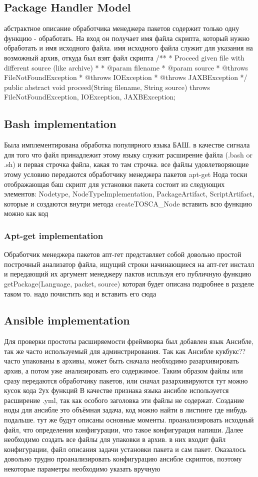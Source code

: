 \subsection*{Package Handler Model}
абстрактное описание обработчика менеджера пакетов содержит только одну функцию - обработать. 
На вход он получает имя файла скрипта, который нужно обработать и имя исходного файла. имя исходного файла служит для указания на возможный архив, откуда был взят файл скрипта
	/**
* Proceed given file with different source (like archive)
* 
* @param filename
* @param source
* @throws FileNotFoundException
* @throws IOException
* @throws JAXBException
*/
public abstract void proceed(String filename, String source) throws FileNotFoundException, IOException, JAXBException;
\fi
\subsection*{Bash implementation}
Была имплементирована обработка популярного языка БАШ. 
в качестве сигнала для того что файл принадлежит этому языку служит расширение файла (.bash or .sh) и первая строчка файла, какая то там строчка.
все файлы удовлетворяющие этому условию передаются обработчику менеджера пакетов apt-get
Нода тоски отображающая баш скрипт для установки пакета состоит из следующих элементов:
Nodetype, NodeTypeImplementation, PackageArtifact, ScriptArtifact, которые и создаются внутри метода createTOSCA_Node
вставить всю функцию можно как код
\fi
\subsubsection*{Apt-get implementation}
Обработчик менеджера пакетов апт-гет представляет собой довольно простой построчный анализатор файла, ищущий строки начинающиеся на апт-гет инсталл и передающий их аргумент менеджеру пактов испльзуя его публичную функцию getPackage(Language, packet, source)
которая будет описана подробнее в разделе таком то. 
надо почистить код и вставить его сюда
\fi
\subsection*{Ansible implementation}
Для проверки простоты расширяемости фреймворка был добавлен язык Ансибле, так же часто используемый для админстрирования.
Так как Ансибле кукбукс?? часто упакованы в архивы, может быть сначала необходимо разархивировать архив, а потом уже анализировать  его содержимое. Таким образом файлы или сразу передаются обработчику пакетов, или сначал разархивируются 
тут можно кусок кода 2ух функций
В качестве признака языка ансибле используется расширение .yml, так как особого заголовка эти файлы не содержат.
Создание ноды для ансибле это объёмная задача, код можно найти в листинге где нибудь подальше. тут же будут описаны основные моменты.
проанализировать исходный файл, что определения конфигурации, что такое конфигурация напиши.
Далее необходимо создать все файлы для упаковки в архив. в них входит файл конфигурации, файл описания задачи установки пакета и сам пакет.
Оказалось довольно трудно проанализировать конфигурацию ансибле скриптов, поэтому некоторые параметры необходимо указать вручную
\fi
